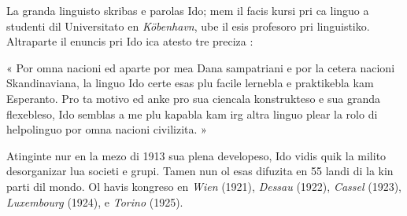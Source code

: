 \begin{VUpage}[237]{}
La granda linguisto skribas e parolas Ido; mem il facis kursi pri\nl
ca linguo a studenti dil Universitato en \textit{Köbenhavn}, ube il esis\nl
profesoro pri linguistiko. Altraparte il enuncis pri Ido ica atesto\nl
tre preciza :

« Por omna nacioni ed aparte por mea Dana sampatriani e por\nl
la cetera nacioni Skandinaviana, la linguo Ido certe esas plu facile\nl
lernebla e praktikebla kam Esperanto. Pro ta motivo ed anke pro\nl
sua ciencala konstrukteso e sua granda flexebleso, Ido semblas a\nl
me plu kapabla kam irg altra linguo plear la rolo di helpolinguo\nl
por omna nacioni civilizita. »

\VUsaut{2.00mm}
\VUsaut{2.30mm}

Atinginte nur en la mezo di 1913 sua plena developeso, Ido vidis\nl
quik la milito desorganizar lua societi e grupi. Tamen nun ol esas\nl
difuzita en 55 landi di la kin parti dil mondo. Ol havis kongreso\nl
en \textit{Wien} (1921), \textit{Dessau} (1922), \textit{Cassel} (1923), \textit{Luxembourg} (1924),\nl
e \textit{Torino} (1925).

\VUsaut{1.70mm}
\VUsaut{1.20mm}
\VUsaut{0.90mm}
\end{VUpage}

